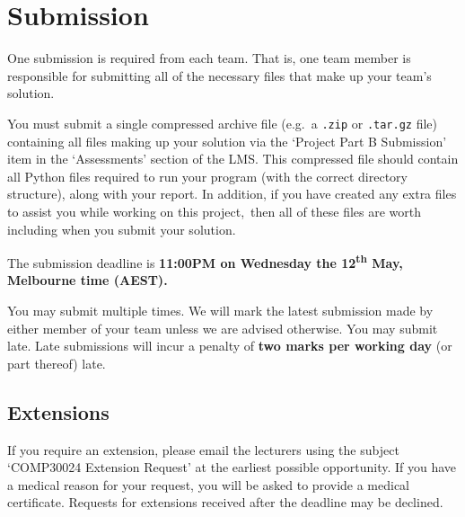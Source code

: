 \documentclass[]{article}
\begin{document}
\section{Submission}
\label{sec:submission}

One submission is required from each team. That is, one team member is
responsible for submitting all of the necessary files that make up your
team's solution.

You must submit a single compressed archive file (e.g.~a \texttt{.zip}
or \texttt{.tar.gz} file) containing all files making up your solution
via the `Project Part B Submission' item in the `Assessments' section of
the LMS. This compressed file should contain all Python files required
to run your program (with the correct directory structure), along with
your report. In addition, if you have created any extra files to assist
you while working on this project,\footnotemark\ then all of these files
are worth including when you submit your solution.


\begin{center}
    The submission deadline is
    \textbf{11:00PM on Wednesday the 12\textsuperscript{th} May,
    Melbourne time (AEST).}
\end{center}


You may submit multiple times.
%
We will mark the latest submission made by either member of your
team unless we are advised otherwise.
%
You may submit late.
%
Late submissions will incur a penalty of \textbf{two marks per working day}
(or part thereof) late.


\subsection{Extensions}

If you require an extension, please email the lecturers using the
subject `COMP30024 Extension Request' at the earliest possible
opportunity.
%
If you have a medical reason for your request, you will be asked to
provide a medical certificate.
%
Requests for extensions received after the deadline may be declined.
\end{document}
